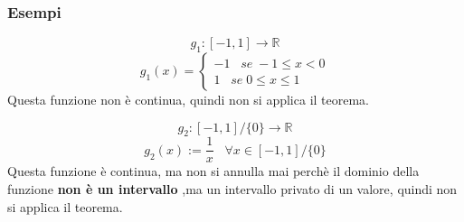 \documentclass[a4paper]{article}
\theoremstyle{break}
\theoremstyle{break}
\theoremstyle{break}
\theoremstyle{break}
\begin{document}
\subsubsection{Esempi}
\begin{example}
    \[
        g_1: [-1,1] \to \mathbb{R}
    \] 
    \[
    g_1(x)= \begin{cases}
        -1 \;\;\; se\; -1 \le x <0 \\
        1 \;\;\; se\; 0 \le x \le 1
    \end{cases}
    \] 
    \label{D7}
    Questa funzione non è continua, quindi non si applica il teorema.
\end{example}

\begin{example}
    \[
        g_2: [-1,1] / \{0\} \to \mathbb{R} 
    \] 
    \[
    g_2(x):= \frac{1}{x}\;\;\; \forall x \in [-1,1] / \{0\}
    \] 
    \label{D8}
    Questa funzione è continua, ma non si annulla mai perchè il dominio della funzione \textbf{non è un intervallo}
    ,ma un intervallo privato di un valore, quindi non si applica il teorema.
\end{example}
\end{document}
